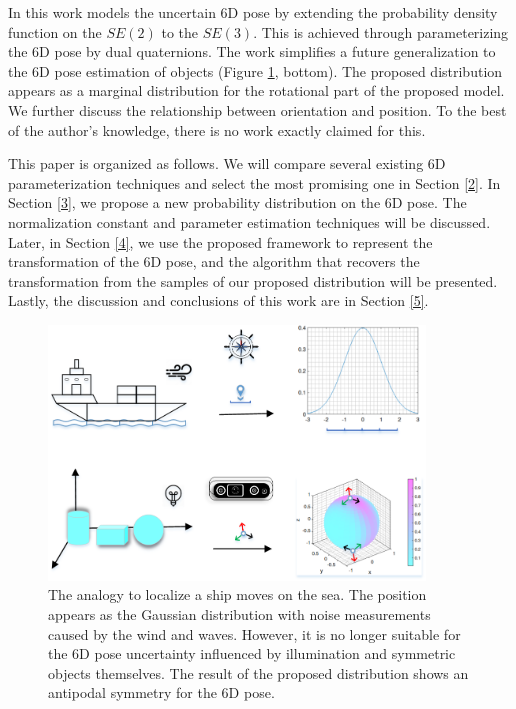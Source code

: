 \documentclass[micromachines,article,accept,pdftex,moreauthors]{Definitions/mdpi}
\begin{document}
In this work {models} the uncertain 6D pose by extending the probability density function on {the $SE(2)$} %
to the {$SE(3)$}. This is achieved through parameterizing the 6D pose by dual quaternions. The work simplifies a future generalization to the 6D pose estimation of objects (Figure \ref{fig1}, bottom). The {proposed} distribution appears as a marginal distribution for the rotational part of the proposed model. We further discuss the relationship between orientation and position. To the best of the author's knowledge, there is no work exactly claimed for this.

This paper is organized as follows. We will compare several existing 6D parameterization techniques and select the most promising one in Section \ref{2}. In Section \ref{3}, we propose a new probability distribution on the 6D pose. The normalization constant and parameter estimation techniques will be discussed. Later, in Section \ref{4}, we use the proposed framework to represent the transformation of the 6D pose, and the algorithm that recovers the transformation from the samples of our proposed distribution will be presented. Lastly, the discussion and conclusions of this work are in Section \ref{5}.


\begin{figure}[H]
\centering
\includegraphics[width=10cm]{Definitions/figs/MODEL_UNCERTAINTY2.3.png}
\caption{{The analogy} %
 to localize a ship moves on the sea. The position appears as the Gaussian distribution with noise measurements caused by the wind and waves. However, it is no longer suitable for the 6D pose uncertainty influenced by illumination and symmetric objects themselves. The result of the proposed distribution shows an antipodal symmetry for the 6D pose. \label{fig1}}
\end{figure}
\end{document}
